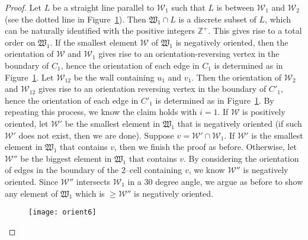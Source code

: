 \documentclass[11pt]{amsart}
\newcommand {\W}{\mathcal W}
\theoremstyle{definition}
\begin{document}
\begin{proof}
Let $L$ be a straight line parallel to $\W_1$ such that $L$ is between $\W_1$ and $\W_2$ (see the dotted line in Figure~\ref{f:orient6}). Then $\mathfrak{W}_1\cap L$ is a discrete subset of $L$, which can be naturally identified with the positive integers $\mathbb Z^+$. This gives rise to a total order on $\mathfrak{W}_1$. If the smallest element $\W$ of $\mathfrak{W}_1$ is negatively oriented, then the orientation of $\W$ and $\W_1$ gives rise to an orientation-reversing vertex in the boundary of $C_1$, hence the orientation of each edge in $C_1$ is determined as in Figure~\ref{f:orient6}. Let $\W_{12}$ be the wall containing $u_1$ and $v_1$. Then the orientation of $\W_2$ and $\W_{12}$ gives rise to an orientation reversing vertex in the boundary of $C'_1$, hence the orientation of each edge in $C'_1$ is determined as in Figure~\ref{f:orient6}. By repeating this process, we know the claim holds with $i=1$. If $\W$ is positively oriented, let $\W'$ be the smallest element in $\mathfrak{W}_1$ that is negatively oriented (if such $\W'$ does not exist, then we are done). Suppose $v=\W'\cap \W_1$. If $\W'$ is the smallest element in $\mathfrak{W}_1$ that contains $v$, then we finish the proof as before. Otherwise, let $\W''$ be the biggest element in $\mathfrak{W}_1$ that contains $v$. By considering the orientation of edges in the boundary of the $2$--cell containing $v$, we know  $\W''$ is negatively oriented. Since $\W''$ intersects $\W_1$ in a 30 degree angle, we argue as before to show any element of $\mathfrak{W}_1$ which is $\ge \W''$ is negatively oriented.
\begin{figure}[h!]
	\centering
	\texttt{[image: orient6]}
	\caption{}
	\label{f:orient6}
\end{figure}


\end{proof}
\end{document}
